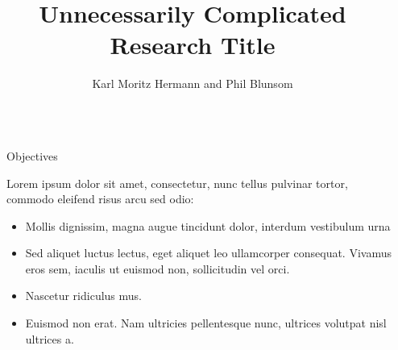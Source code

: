 \documentclass[final]{beamer}
\title{Unnecessarily Complicated Research Title} %
\author{Karl Moritz Hermann and Phil Blunsom} %
\institute{Department of Computer Science, University of Oxford} %
\newlength{\sepwid}
\newlength{\onecolwid}
\begin{document}

\setlength{\belowcaptionskip}{2ex} %
\setlength\belowdisplayshortskip{2ex} %

\begin{frame}[t] %

  \begin{columns}[t] %

  \begin{column}{\sepwid}\end{column} %

    \begin{column}{\onecolwid} %


      \begin{alertblock}{Objectives}

        Lorem ipsum dolor sit amet, consectetur, nunc tellus pulvinar tortor, commodo eleifend risus arcu sed odio:
        \begin{itemize}
          \item Mollis dignissim, magna augue tincidunt dolor, interdum vestibulum urna
          \item Sed aliquet luctus lectus, eget aliquet leo ullamcorper consequat. Vivamus eros sem, iaculis ut euismod non, sollicitudin vel orci.
          \item Nascetur ridiculus mus.
          \item Euismod non erat. Nam ultricies pellentesque nunc, ultrices volutpat nisl ultrices a.
        \end{itemize}

      \end{alertblock}



\end{column}
\end{columns}
\end{frame}
\end{document}
